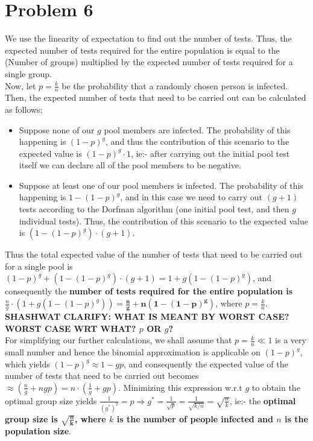 \documentclass[a4paper,11pt]{article}
\numberwithin{definition}{section}
\numberwithin{mytheorem}{subsection}
\begin{document}
\section{Problem 6}
We use the linearity of expectation to find out the number of tests. Thus, the expected number of tests required for the entire population is equal to the
(Number of groups) multiplied by the expected number of tests required for a single group.\\
Now, let $p = \frac{k}{n}$ be the probability that a randomly chosen person is infected. Then, the expected number of tests that need to be carried out can be calculated as follows:
\begin{itemize}
    \item Suppose none of our $g$ pool members are infected. The probability of this happening is $(1-p)^g$, and thus the contribution of this scenario to the expected value is $(1-p)^g\cdot 1$, ie:- after carrying out the initial pool test itself we can declare all of the pool members to be negative.
    \item Suppose at least one of our pool members is infected. The probability of this happening is $1-(1-p)^g$, and in this case we need to carry out $(g+1)$ tests according to the Dorfman algorithm (one initial pool test, and then $g$ individual tests). Thus, the contribution of this scenario to the expected value is $(1-(1-p)^g)\cdot (g+1)$.
\end{itemize}
Thus the total expected value of the number of tests that need to be carried out for a single pool is $(1-p)^g + (1-(1-p)^g)\cdot (g+1) = 1 + g(1-(1-p)^g)$, and consequently the \textbf{number of tests required for the entire population is} $\frac{n}{g}\cdot (1 + g(1-(1-p)^g)) = \boldsymbol{\frac{n}{g} + n(1-(1-p)^g)}$, where $p = \frac{k}{n}$.\\
\textbf{SHASHWAT CLARIFY: WHAT IS MEANT BY WORST CASE? WORST CASE WRT WHAT? $p$ OR $g$?}\\
For simplifying our further calculations, we shall assume that $p = \frac{k}{n} \ll 1$ is a very small number and hence the binomial approximation is applicable on $(1-p)^g$, which yields $(1-p)^g\approx 1-gp$, and consequently the expected value of the number of tests that need to be carried out becomes $\approx (\frac{n}{g} + ngp) = n\cdot (\frac{1}{g} + gp)$. Minimizing this expression w.r.t $g$ to obtain the optimal group size yields $\frac{1}{(g^*)^2} = p\Rightarrow g^* = \frac{1}{\sqrt{p}} = \frac{1}{\sqrt{k/n}} = \sqrt{\frac{n}{k}}$, ie:- the \textbf{optimal group size is $\boldsymbol{\sqrt{\frac{n}{k}}}$, where $k$ is the number of people infected and $n$ is the population size}.
\end{document}
